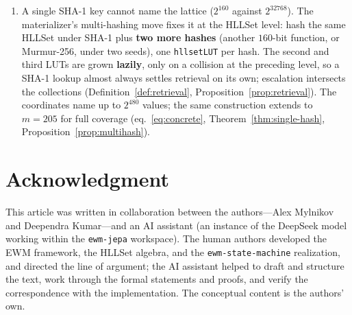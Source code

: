 \documentclass[11pt,a4paper]{article}
\theoremstyle{remark}
\newcommand{\Bnd}{\ensuremath{\Phi}}                %
\begin{document}
\begin{enumerate}[leftmargin=*,nosep]
    $\Bnd_{w_1\to w_2}=\text{ingest}_{w_2}\circ\text{transcribe}\circ{}\allowbreak
    \text{materialize}_{w_1}$, which is deterministic, idempotent on builders,
    and monotone, and which carries \textbf{encodings, not content}
    (Principle~\ref{prin:encodings}). The structure over $\Omega$ is the
    \textbf{holographic presentation} of the world family: one shared
    representation with per-world interpretation fibres, and the bridge is the
    concrete realization of the main paper's geometric-morphism target.
  \item A single SHA-1 key cannot name the lattice ($2^{160}$ against
    $2^{32768}$). The materializer's multi-hashing move fixes it at the HLLSet
    level: hash the same HLLSet under SHA-1 plus \textbf{two more hashes}
    (another $160$-bit function, or Murmur-256, under two seeds), one
    \texttt{hllsetLUT} per hash. The second and third LUTs are grown
    \textbf{lazily}, only on a collision at the preceding level, so a SHA-1
    lookup almost always settles retrieval on its own; escalation intersects
    the collections (Definition~\ref{def:retrieval},
    Proposition~\ref{prop:retrieval}). The coordinates name up to $2^{480}$
    values; the same construction extends to $m=205$ for full coverage
    (eq.~\eqref{eq:concrete}, Theorem~\ref{thm:single-hash},
    Proposition~\ref{prop:multihash}).
\end{enumerate}

\section*{Acknowledgment}
This article was written in collaboration between the authors---Alex Mylnikov
and Deependra Kumar---and an AI assistant (an instance of the DeepSeek model
working within the \texttt{ewm-jepa} workspace). The human authors developed the
EWM framework, the HLLSet algebra, and the \texttt{ewm-state-machine}
realization, and directed the line of argument; the AI assistant helped to
draft and structure the text, work through the formal statements and proofs,
and verify the correspondence with the implementation. The conceptual content
is the authors' own.
\end{document}
